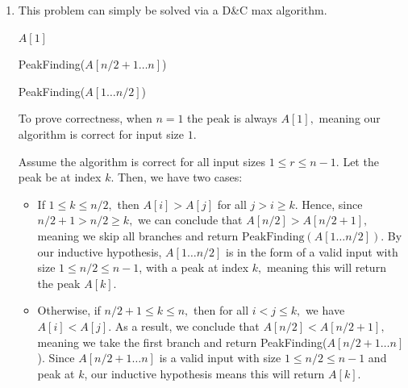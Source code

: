 \documentclass[12pt]{article}
\begin{document}
\begin{enumerate}
    $\therefore,$ via strong induction we have proved that this
    algorithm is correct.

    The recurrence satisfies
    \begin{align*}
      T(n) = 2T(n/2) + \mathcal O(n), \qquad T(1) = \mathcal O(1),
    \end{align*}
    and via the Master theorem the asymptotic complexity is $\mathcal
    O(n \lg n).$

    \newpage

  \item This problem can simply be solved via a D\&C max algorithm.
    \begin{algorithm}
      \caption{D\&C Peak Finding}
      \begin{algorithmic}
        \State \Return $A[1]$
        \EndIf

        \vspace{5mm}

        \State \Return PeakFinding($A[n/2 + 1 \ldots n]$)
        \EndIf

        \vspace{5mm}

        \State \Return PeakFinding($A[1 \ldots n/2]$)
        \EndProcedure
      \end{algorithmic}
    \end{algorithm}
    To prove correctness, when $n = 1$ the peak is always $A[1],$
    meaning our algorithm is correct for input size $1.$

    Assume the algorithm is correct for all input sizes $1 \leq r
    \leq n -1.$ Let the peak be at index $k.$ Then, we have two cases:
    \begin{itemize}
      \item If $1 \leq k \leq n/2,$ then $A[i] > A[j]$ for all $j > i
        \geq k.$ Hence, since $n/2 + 1 > n / 2 \geq k,$ we can
        conclude that $A[n/2] > A[n/2 + 1],$ meaning we skip all
        branches and return $\text{PeakFinding}(A[1 \ldots n/2]).$ By
        our inductive hypothesis, $A[1 \ldots n/2]$ is in the form of
        a valid input with size $1 \leq n/2 \leq n - 1$, with a peak
        at index $k,$ meaning this will return the peak $A[k].$

      \item Otherwise, if $n/2 + 1 \leq k \leq n,$ then for all $i <
        j \leq k,$ we have $A[i] < A[j].$ As a result, we conclude
        that $A[n/2] < A[n/2 + 1],$ meaning we take the first branch
        and return PeakFinding($A[n/2 + 1\ldots n]$). Since $A[n/2 +
        1 \ldots n]$ is a valid input with size $1 \leq n/2 \leq n -
        1$ and peak at $k$, our inductive hypothesis means this will
        return $A[k].$
    \end{itemize}


\end{enumerate}
\end{document}
